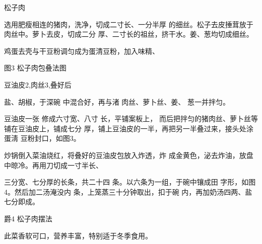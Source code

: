 \begin{recipe}{松子肉}

\ingredients


\cooking

\step 选用肥瘦相连的猪肉，洗净，切成二寸长、一分半厚 的细丝。松子去皮捶茸放于肉丝中。萝卜去皮，切成二分 厚、二寸长的祖丝，挤干水。姜、葱均切成细丝。

\step 鸡蛋去壳与干豆粉调匀成为蛋清豆粉，加入味精、

图3 松子肉包叠法图

\step 豆油皮2,肉丝3,叠好后

盐、胡椒，于深碗 中混合好，再与渚 肉丝、萝卜丝、姜、 葱一并拌匀。

\step 豆油皮一张 修成六寸宽、八寸 长，平铺案板上， 而后把拌匀的猪肉丝、萝卜丝等铺在豆油皮上，铺成七分 厚，铺上豆油皮的一半，再把另一半叠过来，接头处涂蛋淸 豆粉封口，如图3。

\step 炒锅倒入菜油烧红，将叠好的豆油皮包放入炸透，炸 成金黄色，泌去炸油，放盘中晾冷。再用刀切成一寸半长、

三分宽、七分厚的长条，共二十四 条。以六条为一组，于碗中镶成田 字形，如图4。然后加二汤淹没内 条，上笼蒸三十分钟取出，扣于碗 内，再加奶汤四两、盐七分即成。

爵4 松子肉摆法

\notes

此菜香软可口，营养丰富，特别适于冬季食用。

\end{recipe}

